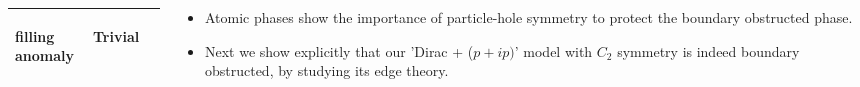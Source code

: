 \documentclass{beamer}
\renewcommand{\(}{\left(}
\renewcommand{\)}{\right)}
\renewcommand{\[}{\left[}
\renewcommand{\]}{\right]}
\begin{document}
\begin{frame}
\begin{columns}
\begin{column}{0.5\textwidth}
\begin{table}
\begin{adjustbox}{width=\columnwidth,center}
\begin{tabular}{|| p{2.5cm}| p{2.5cm} | p{2.5cm}||}
\begin{center}
                        filling anomaly
                        \end{center}
                        & 
                        \begin{center}
                        Trivial
                        \end{center}
                            \\ 
                        \hline
                        \end{tabular}
                \end{adjustbox}
            \end{table}
        \end{column}
        \begin{column}{0.5\textwidth}
            \begin{itemize}
                \item Atomic phases show the importance of particle-hole symmetry to protect the boundary obstructed phase.  \pause 
                \item Next we show explicitly that our 'Dirac + ($p+ip)$' model with $C_2$ symmetry is indeed boundary obstructed, by studying its edge theory. 
            \end{itemize}
        \end{column}
    \end{columns}


\end{frame}
\end{document}
